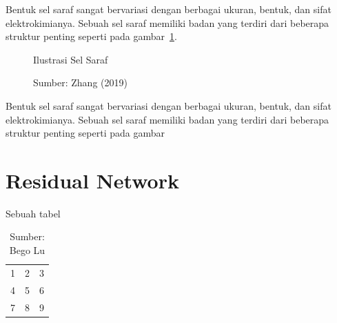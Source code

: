 Bentuk sel saraf sangat bervariasi dengan berbagai ukuran, bentuk, dan sifat elektrokimianya. Sebuah
sel saraf memiliki badan yang terdiri dari beberapa struktur penting seperti pada
gambar~\ref{fig:selsaraf}.

\begin{figure}[htbp]
  \begin{center}
  \end{center}
  \vspace{-20pt}
  \captionsetup{labelfont=bf, textfont=bf}
  \caption{Ilustrasi Sel Saraf}
  \vspace{-10pt}
  \captionsetup{labelfont=md, textfont=md}
  \caption*{Sumber: Zhang (2019)}
  \label{fig:selsaraf}
\end{figure}

Bentuk sel saraf sangat bervariasi dengan berbagai ukuran, bentuk, dan sifat elektrokimianya. Sebuah
sel saraf memiliki badan yang terdiri dari beberapa struktur penting seperti pada gambar

\section{Residual Network}
\label{sec:2-ResidualNetwork}

\begin{table}[htbp]
  \captionsetup{labelfont=bf, textfont=bf}
  \caption{Sebuah tabel}
  \vspace{-20pt}
  \begin{center}
    \begin{tabular}{| l c r |}
      \hline
      1 & 2 & 3 \\
      4 & 5 & 6 \\
      7 & 8 & 9 \\
      \hline
    \end{tabular}
  \end{center}
  \vspace{-10pt}
  \captionsetup{labelfont=md, textfont=md}
  \caption*{Sumber: Bego Lu}
\end{table}

